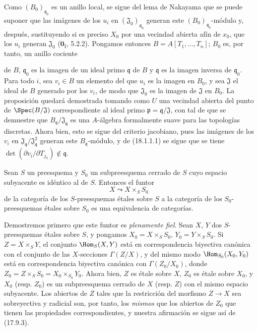Como $(B_0)_{\mathfrak q_0}$ es un anillo local, se sigue del lema de Nakayama que se puede suponer que las imágenes de los $u_i$ en $(\mathfrak J_0)_{\mathfrak q_0}$ generan este $(B_0)_{\mathfrak q_0}$-módulo y, después, sustituyendo si es preciso $X_0$ por una vecindad abierta afín de $x_0$, que los $u_i$ generan $\mathfrak J_0$ ($\mathbf{0}_{\mathrm I}$, 5.2.2). Pongamos entonces $B=A[T_1,\ldots,T_n]$; $B_0$ es, por tanto, un anillo cociente


de $B$, $\mathfrak q_0$ es la imagen de un ideal primo $\mathfrak q$ de $B$ y $\mathfrak q$ es la imagen inversa de $\mathfrak q_0$. Para todo $i$, sea $v_i\in B$ un elemento del que $u_i$ es la imagen en $B_0$, y sea $\mathfrak J$ el ideal de $B$ generado por los $v_i$, de modo que $\mathfrak J_0$ es la imagen de $\mathfrak J$ en $B_0$. La proposición quedará demostrada tomando como $U$ una vecindad abierta del punto de $\Spec(B/\mathfrak J)$ correspondiente al ideal primo $\mathfrak p=\mathfrak q/\mathfrak J$, con tal de que se demuestre que $B_{\mathfrak q}/\mathfrak J_{\mathfrak q}$ es una $A$-álgebra formalmente suave para las topologías discretas. Ahora bien, esto se sigue del criterio jacobiano, pues las imágenes de los $v_i$ en $\mathfrak J_{\mathfrak q}/\mathfrak J_{\mathfrak q}^2$ generan este $B_{\mathfrak q}$-módulo, y de (18.1.1.1) se sigue que se tiene $\det(\partial v_i/\partial T_{j_h})\notin\mathfrak q$.

\begin{theorem}[18.1.2]
\label{IV.18.1.2}
Sean $S$ un preesquema y $S_0$ un subpreesquema cerrado de $S$ cuyo espacio subyacente es idéntico al de $S$. Entonces el funtor
\[
  X\leadsto X\times_S S_0
\]
de la categoría de los $S$-preesquemas étales sobre $S$ a la categoría de los $S_0$-preesquemas étales sobre $S_0$ es una equivalencia de categorías.
\end{theorem}

Demostremos primero que este funtor es \emph{plenamente fiel}. Sean $X$, $Y$ dos $S$-preesquemas étales sobre $S$, y pongamos $X_0=X\times_S S_0$, $Y_0=Y\times_S S_0$. Si $Z=X\times_S Y$, el conjunto $\Hom_S(X,Y)$ está en correspondencia biyectiva canónica con el conjunto de las $X$-secciones $\Gamma(Z/X)$, y del mismo modo $\Hom_{S_0}(X_0,Y_0)$ está en correspondencia biyectiva canónica con $\Gamma(Z_0/X_0)$, donde $Z_0=Z\times_S S_0=X_0\times_{S_0}Y_0$. Ahora bien, $Z$ es étale sobre $X$, $Z_0$ es étale sobre $X_0$, y $X_0$ (resp. $Z_0$) es un subpreesquema cerrado de $X$ (resp. $Z$) con el mismo espacio subyacente. Los abiertos de $Z$ tales que la restricción del morfismo $Z\to X$ sea sobreyectiva y radicial son, por tanto, los \emph{mismos} que los abiertos de $Z_0$ que tienen las propiedades correspondientes, y nuestra afirmación se sigue así de (17.9.3).

